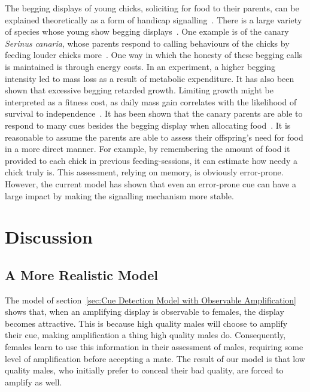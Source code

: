 \documentclass[a4paper,12pt]{article}
\numberwithin{equation}{section}
\begin{document}
The begging displays of young chicks, soliciting for food to their parents, can be explained theoretically as a form of handicap signalling~\cite{Godfray1991}. There is a large variety of species whose young show begging displays~\cite{Kilner1997}. One example is of the canary \textit{Serinus canaria}, whose parents respond to calling behaviours of the chicks by feeding louder chicks more~\cite{Kilner1995}. One way in which the honesty of these begging calls is maintained is through energy costs. In an experiment, a higher begging intensity led to mass loss as a result of metabolic expenditure. It has also been shown that excessive begging retarded growth. Limiting growth might be interpreted as a fitness cost, as daily mass gain correlates with the likelihood of survival to independence~\cite{Kilner2001}. It has been shown that the canary parents are able to respond to many cues besides the begging display when allocating food~\cite{Kilner1995}. It is reasonable to assume the parents are able to assess their offspring's need for food in a more direct manner. For example, by remembering the amount of food it provided to each chick in previous feeding-sessions, it can estimate how needy a chick truly is. This assessment, relying on memory, is obviously error-prone. However, the current model has shown that even an error-prone cue can have a large impact by making the signalling mechanism more stable.

\newpage\clearpage


\section{Discussion}
\label{sec:Part 3/Discussion}
\subsection{A More Realistic Model}
\label{sec:A More Realistic Model}

The model of section~\ref{sec:Cue Detection Model with Observable Amplification} shows that, when an amplifying display is observable to females, the display becomes attractive. This is because high quality males will choose to amplify their cue, making amplification a thing high quality males do. Consequently, females learn to use this information in their assessment of males, requiring some level of amplification before accepting a mate. The result of our model is that low quality males, who initially prefer to conceal their bad quality, are forced to amplify as well.
\end{document}
